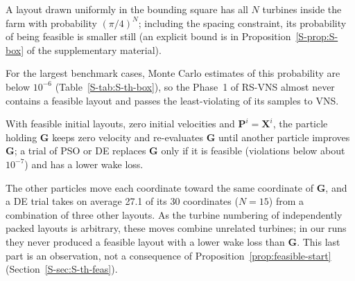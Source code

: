 \begin{proposition}\label{prop:box}
A layout drawn uniformly in the bounding square has all $N$ turbines inside the farm with probability $(\pi/4)^N$; including the spacing constraint, its probability of being feasible is smaller still (an explicit bound is in Proposition~\ref{S-prop:S-box} of the supplementary material).
\end{proposition}
For the largest benchmark cases, Monte Carlo estimates of this probability are below $10^{-6}$ (Table~\ref{S-tab:S-th-box}), so the Phase~1 of RS-VNS almost never contains a feasible layout and passes the least-violating of its samples to VNS.
%
\begin{proposition}\label{prop:feasible-start}
With feasible initial layouts, zero initial velocities and $\mathbf P^i=\mathbf X^i$, the particle holding $\mathbf G$ keeps zero velocity and re-evaluates $\mathbf G$ until another particle improves $\mathbf G$; a trial of PSO or DE replaces $\mathbf G$ only if it is feasible (violations below about $10^{-7}$) and has a lower wake loss.
\end{proposition}
The other particles move each coordinate toward the same coordinate of $\mathbf G$, and a DE trial takes on average 27.1 of its 30 coordinates ($N=15$) from a combination of three other layouts. As the turbine numbering of independently packed layouts is arbitrary, these moves combine unrelated turbines; in our runs they never produced a feasible layout with a lower wake loss than $\mathbf G$. This last part is an observation, not a consequence of Proposition~\ref{prop:feasible-start} (Section~\ref{S-sec:S-th-feas}).
